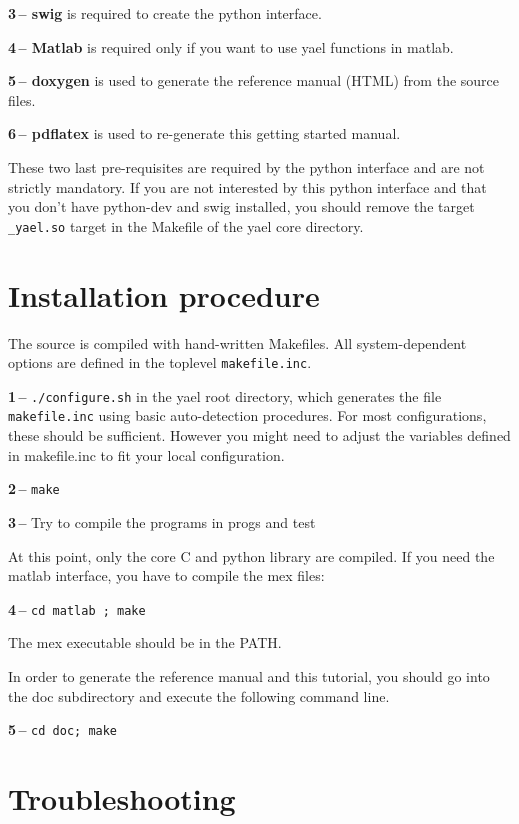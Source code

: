 \documentclass[a4paper,11pt,notitlepage,final,twoside]{report}
\begin{document}
{\bf 3\,-- swig} is required to create the python interface. 
\bigskip

{\bf 4\,-- Matlab} is required only if you want to use yael functions in matlab. 
\bigskip

{\bf 5\,-- doxygen} is used to generate the reference manual (HTML) from the source files. 
\bigskip

{\bf 6\,-- pdflatex} is used to re-generate this getting started manual. 
\bigskip


These two last pre-requisites are required by the python interface 
and are not strictly mandatory. If you are not interested by this 
python interface and that you don't have python-dev and swig installed, 
you should remove the target \texttt{\_yael.so} target in the Makefile of the 
yael core directory. 


\section{Installation procedure}

The source is compiled with hand-written Makefiles. 
All system-dependent options are defined in the toplevel \texttt{makefile.inc}. 
\bigskip

{\bf 1\,--} \texttt{./configure.sh} in the yael root directory, which generates 
the file \texttt{makefile.inc} using basic auto-detection procedures. 
For most configurations, these should be sufficient. However you might need 
to adjust the variables defined in makefile.inc to fit your local configuration. 
\bigskip

{\bf 2\,--} \texttt{make}
\bigskip

{\bf 3\,--} Try to compile the programs in progs and test
\medskip

At this point, only the core C and python library are compiled. 
If you need the matlab interface, you have to compile the mex files:
\bigskip

{\bf 4\,--} \texttt{cd matlab ; make}
\smallskip

The mex executable should be in the PATH. 
\bigskip

In order to generate the reference manual and this tutorial, you should go into the 
doc subdirectory and execute the following command line. 
\smallskip

{\bf 5\,--} \texttt{cd doc; make}
\bigskip

\section{Troubleshooting}
\end{document}
